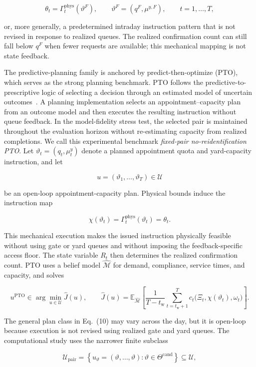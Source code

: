 \documentclass[preprint,12pt,authoryear,a4paper]{elsarticle}
\begin{document}
\[
\theta_t=\Gamma_t^{\mathrm{phys}}(\vartheta^F),
\qquad \vartheta^F=(q^F,\mu^{y,F}),
\qquad t=1,\ldots,T,
\tag{9}
\]

or, more generally, a predetermined intraday instruction pattern that is not revised in response to realized queues. The realized confirmation count can still fall below \(q^F\) when fewer requests are available; this mechanical mapping is not state feedback.

The predictive-planning family is anchored by predict-then-optimize (PTO), which serves as the strong planning benchmark. PTO follows the predictive-to-prescriptive logic of selecting a decision through an estimated model of uncertain outcomes~\citep{BertsimasKallus2020PrescriptiveAnalytics,ElmachtoubGrigas2022SmartPTO}. A planning implementation selects an appointment--capacity plan from an outcome model and then executes the resulting instruction without queue feedback. In the model-fidelity stress test, the selected pair is maintained throughout the evaluation horizon without re-estimating capacity from realized completions. We call this experimental benchmark \emph{fixed-pair no-reidentification PTO}. Let \(\vartheta_t=(q_t,\mu_t^y)\) denote a planned appointment quota and yard-capacity instruction, and let

\[
u=(\vartheta_1,\ldots,\vartheta_T)\in\mathcal U
\]

be an open-loop appointment-capacity plan. Physical bounds induce the instruction map

\[
\chi(\vartheta_t)
=\Gamma_t^{\mathrm{phys}}(\vartheta_t)
=\theta_t.
\]

This mechanical execution makes the issued instruction physically feasible without using gate or yard queues and without imposing the feedback-specific access floor. The state variable \(R_t\) then determines the realized confirmation count. PTO uses a belief model \(\widehat{\mathcal M}\) for demand, compliance, service times, and capacity, and solves

\[
u^{\mathrm{PTO}}
\in\arg\min_{u\in\mathcal U}\widehat J(u),
\qquad
\widehat J(u)=
\mathbb E_{\widehat{\mathcal M}}
\left[
\frac{1}{T-t_{\mathrm w}}
\sum_{t=t_{\mathrm w}+1}^{T}
c_t\bigl(\Xi_t,\chi(\vartheta_t),\omega_t\bigr)
\right].
\tag{10}
\]

The general plan class in Eq.~(10) may vary across the day, but it is open-loop because execution is not revised using realized gate and yard queues. The computational study uses the narrower finite subclass

\[
\mathcal U_{\mathrm{pair}}
=\left\{u_{\vartheta}=(\vartheta,\ldots,\vartheta):
\vartheta\in\Theta^{\mathrm{cand}}\right\}
\subseteq\mathcal U,
\]
\end{document}
